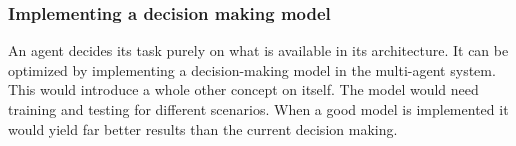 \subsubsection{Implementing a decision making model}

An agent decides its task purely on what is available in its architecture. It can be optimized
by implementing a decision-making model in the multi-agent system. This would introduce
a whole other concept on itself. The model would need training and testing for different
scenarios. When a good model is implemented it would yield far better results than the
current decision making.